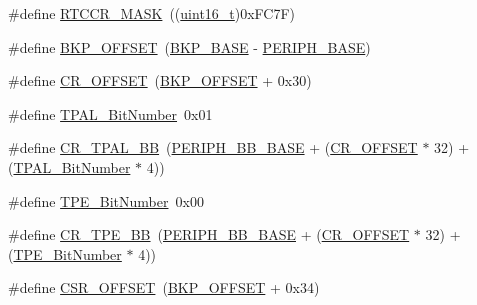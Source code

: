\begin{DoxyCompactItemize}
\item 
\#define \hyperlink{group___b_k_p___private___defines_ga4bda91755d5ae28e9e487e946917a1ec}{R\+T\+C\+C\+R\+\_\+\+M\+A\+SK}~((\hyperlink{_p_e___types_8h_a1f1825b69244eb3ad2c7165ddc99c956}{uint16\+\_\+t})0x\+F\+C7\+F)
\item 
\#define \hyperlink{group___b_k_p___private___defines_gaaaf71f474657e7c0c5b0d6ba9697cf5d}{B\+K\+P\+\_\+\+O\+F\+F\+S\+ET}~(\hyperlink{openmotestm_2library_2inc_2stm32f10x__map_8h_aa15d5a9f40794105397ba5ea567c4ae1}{B\+K\+P\+\_\+\+B\+A\+SE} -\/ \hyperlink{openmotestm_2library_2inc_2stm32f10x__map_8h_a9171f49478fa86d932f89e78e73b88b0}{P\+E\+R\+I\+P\+H\+\_\+\+B\+A\+SE})
\item 
\#define \hyperlink{group___b_k_p___private___defines_gafa1d3d0ea72132df651c76fc1bdffffc}{C\+R\+\_\+\+O\+F\+F\+S\+ET}~(\hyperlink{openmotestm_2library_2src_2stm32f10x__bkp_8c_aaaf71f474657e7c0c5b0d6ba9697cf5d}{B\+K\+P\+\_\+\+O\+F\+F\+S\+ET} + 0x30)
\item 
\#define \hyperlink{group___b_k_p___private___defines_ga4af1869d665b8804104b6754c787820a}{T\+P\+A\+L\+\_\+\+Bit\+Number}~0x01
\item 
\#define \hyperlink{group___b_k_p___private___defines_gaa36e52f37b9fa6982bd224a6dcb86f78}{C\+R\+\_\+\+T\+P\+A\+L\+\_\+\+BB}~(\hyperlink{openmotestm_2library_2inc_2stm32f10x__map_8h_aed7efc100877000845c236ccdc9e144a}{P\+E\+R\+I\+P\+H\+\_\+\+B\+B\+\_\+\+B\+A\+SE} + (\hyperlink{openmotestm_2library_2src_2stm32f10x__rcc_8c_afa1d3d0ea72132df651c76fc1bdffffc}{C\+R\+\_\+\+O\+F\+F\+S\+ET} $\ast$ 32) + (\hyperlink{openmotestm_2library_2src_2stm32f10x__bkp_8c_a4af1869d665b8804104b6754c787820a}{T\+P\+A\+L\+\_\+\+Bit\+Number} $\ast$ 4))
\item 
\#define \hyperlink{group___b_k_p___private___defines_ga8c68be900246b028ff4af93ad119eb98}{T\+P\+E\+\_\+\+Bit\+Number}~0x00
\item 
\#define \hyperlink{group___b_k_p___private___defines_ga6c11e801c2c1aa87ec2feaefe12bbb96}{C\+R\+\_\+\+T\+P\+E\+\_\+\+BB}~(\hyperlink{openmotestm_2library_2inc_2stm32f10x__map_8h_aed7efc100877000845c236ccdc9e144a}{P\+E\+R\+I\+P\+H\+\_\+\+B\+B\+\_\+\+B\+A\+SE} + (\hyperlink{openmotestm_2library_2src_2stm32f10x__rcc_8c_afa1d3d0ea72132df651c76fc1bdffffc}{C\+R\+\_\+\+O\+F\+F\+S\+ET} $\ast$ 32) + (\hyperlink{openmotestm_2library_2src_2stm32f10x__bkp_8c_a8c68be900246b028ff4af93ad119eb98}{T\+P\+E\+\_\+\+Bit\+Number} $\ast$ 4))
\item 
\#define \hyperlink{group___b_k_p___private___defines_ga984cbe73312b6d3d355c5053763d499a}{C\+S\+R\+\_\+\+O\+F\+F\+S\+ET}~(\hyperlink{openmotestm_2library_2src_2stm32f10x__bkp_8c_aaaf71f474657e7c0c5b0d6ba9697cf5d}{B\+K\+P\+\_\+\+O\+F\+F\+S\+ET} + 0x34)

\end{DoxyCompactItemize}
